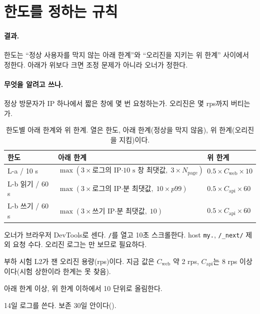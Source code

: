 \section{한도를 정하는 규칙}\label{sec:bl-threshold}

\paragraph{결과.}
한도는 ``정상 사용자를 막지 않는 아래 한계''와 ``오리진을 지키는 위 한계'' 사이에서 정한다.
아래가 위보다 크면 조정 문제가 아니라 오너가 정한다.

\paragraph{무엇을 알려고 쓰나.}
정상 방문자가 IP 하나에서 짧은 창에 몇 번 요청하는가.
오리진은 몇 rps까지 버티는가.

\begin{table}[H]
  \caption{한도별 아래 한계와 위 한계. 열은 한도, 아래 한계(정상을 막지 않음), 위 한계(오리진을 지킴)이다.}
  \label{tab:bl-threshold}
  \centering\small
  \begin{tabularx}{\linewidth}{@{}L{3.0cm}L{5.2cm}Y@{}}
    \toprule
    한도 & 아래 한계 & 위 한계 \\
    \midrule
    L-a  / 10 s & $\max(3\times \text{로그의 IP·10 s 창 최댓값},\; 3\times N_{\text{page}})$ & $0.5\times C_{\text{web}}\times 10$ \\
    \midrule
    L-b 읽기 / 60 s & $\max(3\times \text{로그의 IP·분 최댓값},\; 10\times p99)$ & $0.5\times C_{\text{api}}\times 60$ \\
    \midrule
    L-b 쓰기 / 60 s & $\max(3\times \text{쓰기 IP·분 최댓값},\; 10)$ & $0.5\times C_{\text{api}}\times 60$ \\
    \bottomrule
  \end{tabularx}
\end{table}

\begin{description}[font=\bfseries]
  \item[$N_{\text{page}}$] 오너가 브라우저 DevTools로 센다. \texttt{/}를 열고 10초 스크롤한다. host \texttt{my.}, \texttt{/\_next/} 제외 요청 수다. 오리진 로그는 만 보므로 필요하다.
  \item[$C_{\text{web}}$, $C_{\text{api}}$] 부하 시험 L2가 잰 오리진 용량(rps)이다. 지금 값은 $C_{\text{web}}$ 약 2 rps, $C_{\text{api}}$는 8 rps 이상이다(시험 상한이라 한계는 못 찾음).
  \item[정하는 법] 아래 한계 이상, 위 한계 이하에서 10 단위로 올림한다.
  \item[기간] 14일 로그를 쓴다. 보존 30일 안이다().
\end{description}

